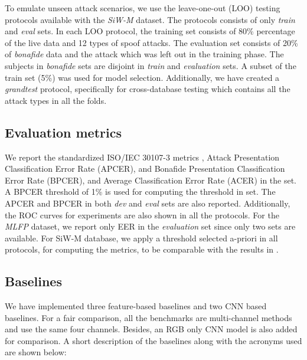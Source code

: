 \documentclass[journal]{IEEEtran}
\begin{document}
To emulate unseen attack scenarios, we use the leave-one-out (LOO) testing protocols available with the \textit{SiW-M} \cite{Liu_2019_CVPR} dataset. The protocols consists of only \textit{train} and \textit{eval} sets. In each LOO protocol, the training set consists of 80\% percentage of the live data and 12 types of spoof attacks. The evaluation set consists of 20\% of \textit{bonafide} data and the attack which was left out in the training phase. The subjects in \textit{bonafide} sets are disjoint in \textit{train} and \textit{evaluation} sets. A subset of the train set (5\%) was used for model selection.  Additionally, we have created a \textit{grandtest} protocol, specifically for cross-database testing which contains all the attack types in all the folds.

\subsection{Evaluation metrics}

We report the standardized ISO/IEC 30107-3 metrics \cite{ISO}, Attack Presentation Classification Error Rate (APCER),  and Bonafide Presentation Classification Error Rate (BPCER), and  Average Classification Error Rate (ACER) in the   set. A BPCER threshold of 1\% is used for computing the threshold in  set. The APCER and BPCER in both \textit{dev} and \textit{eval} sets are also reported. Additionally, the ROC curves for experiments are also shown in all the protocols. For the \textit{MLFP} dataset, we report only EER in the \textit{evaluation} set since only two sets are available. For SiW-M database, we apply a threshold selected a-priori in all protocols, for computing the metrics, to be comparable with the results in \cite{Liu_2019_CVPR}.
\subsection{Baselines}

We have implemented three feature-based baselines and two CNN based baselines. For a fair comparison, all the benchmarks are multi-channel methods and use the same four channels. Besides, an RGB only CNN model is also added for comparison.
A short description of the baselines along with the acronyms used are shown below:
\end{document}
